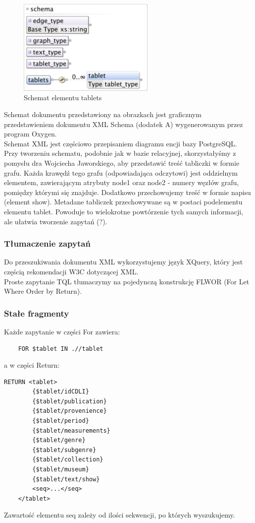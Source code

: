 \begin{figure}[h]
 \centering
 \includegraphics[width=250px]{../diagramy/schema_tablets.pdf}
 \caption{Schemat elementu tablets}
\end{figure}

Schemat dokumentu przedstawiony na obrazkach jest graficznym przedstawieniem dokumentu XML Schema (dodatek A) wygenerowanym przez program Oxygen.\\
Schemat XML jest częściowo przepisaniem diagramu encji bazy PostgreSQL. Przy tworzeniu schematu, podobnie jak w bazie relacyjnej, skorzystałyśmy z pomysłu dra Wojciecha Jaworskiego, aby przedstawić treść tabliczki w formie grafu. Każda krawędź tego grafu (odpowiadająca odczytowi) jest oddzielnym elementem, zawierającym atrybuty node1 oraz node2 - numery węzłów grafu, pomiędzy którymi się znajduje. Dodatkowo przechowujemy treść w formie napisu (element show). Metadane tabliczek przechowywane są w postaci podelementu elementu tablet. Powoduje to wielokrotne powtórzenie tych samych informacji, ale ułatwia tworzenie zapytań (?).


\subsubsection{Tłumaczenie zapytań}
Do przeszukiwania dokumentu XML wykorzystujemy język XQuery, który jest częścią rekomendacji W3C dotyczącej XML.\\
Proste zapytanie TQL tłumaczymy na pojedynczą konstrukcję FLWOR (For Let Where Order by Return).\\

\subsubsection{Stałe fragmenty}
Każde zapytanie w części For zawiera:
	\begin{verbatim}
	FOR $tablet IN .//tablet
\end{verbatim}
a w części Return:
  \begin{verbatim}RETURN <tablet>
		{$tablet/idCDLI}
		{$tablet/publication}
		{$tablet/provenience}
		{$tablet/period}
		{$tablet/measurements}
		{$tablet/genre}
		{$tablet/subgenre}
		{$tablet/collection}
		{$tablet/museum}
		{$tablet/text/show}
		<seq>...</seq>
	</tablet>
\end{verbatim}
Zawartość elementu seq zależy od ilości sekwencji, po których wyszukujemy. 

